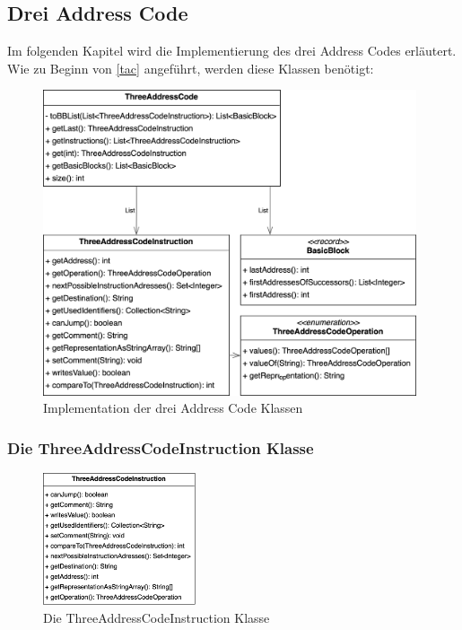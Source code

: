 \subsection{Drei Address Code}
Im folgenden Kapitel wird die Implementierung des drei Address Codes erläutert.
Wie zu Beginn von \cref{tac} angeführt, werden diese Klassen benötigt:
\begin{figure}[h]
  \centering
  \includegraphics[width=0.98\textwidth]{fig/3AC_classes_methods.png}
  \caption{Implementation der drei Address Code Klassen}
  \label{fig:3ac-classes}
\end{figure}


\newpage
\subsubsection{Die ThreeAddressCodeInstruction Klasse}
\begin{figure}
  \centering
  \includegraphics[width=0.4\textwidth]{fig/3AC_ThreeAddressCodeInstruction_methods.png}
  \caption{Die ThreeAddressCodeInstruction Klasse}
  \label{fig:ThreeAddressCodeInstruction}
\end{figure}

